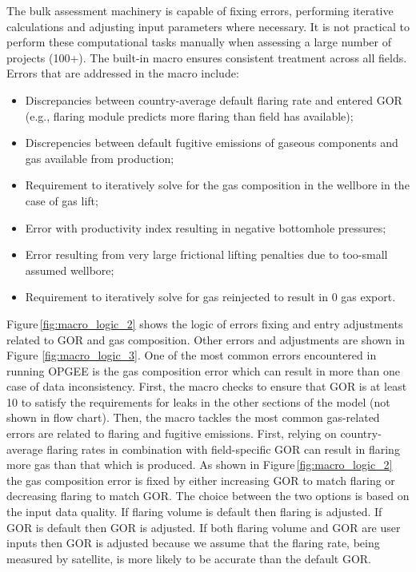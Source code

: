 \documentclass[11pt]{report}
\begin{document}
The bulk assessment machinery is capable of fixing errors, performing iterative calculations and adjusting input parameters where necessary. It is not practical to perform these computational tasks manually when assessing a large number of projects (100+). The built-in macro ensures consistent treatment across all fields. Errors that are addressed in the macro include:
\begin{itemize}
\item Discrepancies between country-average default flaring rate and entered GOR (e.g., flaring module predicts more flaring than field has available);
\item Discrepencies between default fugitive emissions of gaseous components and gas available from production;
\item Requirement to iteratively solve for the gas composition in the wellbore in the case of gas lift;
\item Error with productivity index resulting in negative bottomhole pressures;
\item Error resulting from very large frictional lifting penalties due to too-small assumed wellbore;
\item Requirement to iteratively solve for gas reinjected to result in 0 gas export.
\end{itemize}

Figure\,\ref{fig:macro_logic_2} shows the logic of errors fixing and entry adjustments related to GOR and gas composition. Other errors and adjustments are shown in Figure \ref{fig:macro_logic_3}. One of the most common errors encountered in running OPGEE is the gas composition error which can result in more than one case of data inconsistency. First, the macro checks to ensure that GOR is at least 10 to satisfy the requirements for leaks in the other sections of the model (not shown in flow chart). Then, the macro tackles the most common gas-related errors are related to flaring and fugitive emissions. First, relying on country-average flaring rates in combination with field-specific GOR can result in flaring more gas than that which is produced. As shown in Figure\,\ref{fig:macro_logic_2} the gas composition error is fixed by either increasing GOR to match flaring or decreasing flaring to match GOR. The choice between the two options is based on the input data quality. If flaring volume is default then flaring is adjusted. If GOR is default then GOR is adjusted. If both flaring volume and GOR are user inputs then GOR is adjusted because we assume that the flaring rate, being measured by satellite, is more likely to be accurate than the default GOR.
\end{document}
